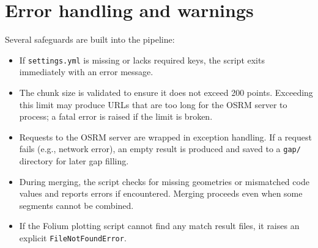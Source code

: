 \documentclass[12pt,a4paper]{article}
\begin{document}
\section{Error handling and warnings}
Several safeguards are built into the pipeline:
\begin{itemize}
	\item If \texttt{settings.yml} is missing or lacks required keys, the script
	      exits immediately with an error message.
	\item The chunk size is validated to ensure it does not exceed 200 points.
	      Exceeding this limit may produce URLs that are too long for the OSRM
	      server to process; a fatal error is raised if the limit is broken.
	\item Requests to the OSRM server are wrapped in exception handling.  If a
	      request fails (e.g., network error), an empty result is produced and
	      saved to a \texttt{gap/} directory for later gap filling.
	\item During merging, the script checks for missing geometries or mismatched
	      code values and reports errors if encountered.  Merging proceeds even
	      when some segments cannot be combined.
	\item If the Folium plotting script cannot find any match result files, it
	      raises an explicit \texttt{FileNotFoundError}.
\end{itemize}
\end{document}
